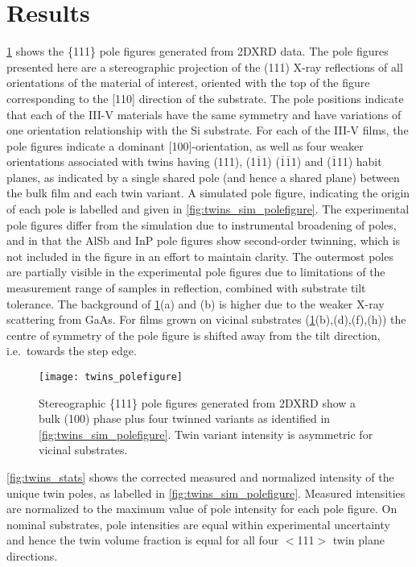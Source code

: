 \section{Results}
\cref{fig:twins_polefigure} shows the \{111\} pole figures generated from 2DXRD data.
The pole figures presented here are a stereographic projection of the (111) X-ray reflections of all orientations of the material of interest, oriented with the top of the figure corresponding to the [110] direction of the substrate.
The pole positions indicate that each of the III-V materials have the same symmetry and have variations of one orientation relationship with the Si substrate.
For each of the III-V films, the pole figures indicate a dominant [100]-orientation, as well as four weaker orientations associated with twins having (111), (1\(\overline{1}\)1)
(\(\overline{1}\overline{1}\)1)
and (\(\overline{1}\)11) habit planes, as indicated by a single shared pole (and hence a shared plane) between the bulk film and each twin variant.
A simulated pole figure, indicating the origin of each pole is labelled and given in \cref{fig:twins_sim_polefigure}.
The experimental pole figures differ from the simulation due to instrumental broadening of poles, and in that the AlSb and InP pole figures show second-order twinning, which is not included in the figure in an effort to maintain clarity.
The outermost poles are partially visible in the experimental pole figures due to limitations of the measurement range of samples in reflection, combined with substrate tilt tolerance.
The background of \cref{fig:twins_polefigure}(a) and (b) is higher due to the weaker X-ray scattering from GaAs.
For films grown on vicinal substrates (\cref{fig:twins_polefigure}(b),(d),(f),(h)) the centre of symmetry of the pole figure is shifted away from the tilt direction, i.e.\ towards the step edge.
\begin{figure}
 \centering \texttt{[image: twins\_polefigure]}
 \caption[Pole figures of nominal and vicinal substrates]{\label{fig:twins_polefigure}Stereographic \{111\} pole figures generated from 2DXRD show a bulk (100) phase plus four twinned variants as identified in \cref{fig:twins_sim_polefigure}.
  Twin variant intensity is asymmetric for vicinal substrates.}
\end{figure}
\cref{fig:twins_stats} shows the corrected measured and normalized intensity of the unique twin poles, as labelled in \cref{fig:twins_sim_polefigure}.
Measured intensities are normalized to the maximum value of pole intensity for each pole figure.
On nominal substrates, pole intensities are equal within experimental uncertainty and hence the twin volume fraction is equal for all four \(<\)111\(>\) twin plane directions.
